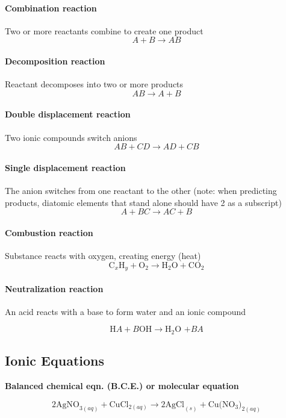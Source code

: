 \documentclass[a4paper, 12pt]{article}
\begin{document}
\paragraph{Combination reaction}
Two or more reactants combine to create one product
$$ A + B \longrightarrow AB$$

\paragraph{Decomposition reaction}
Reactant decomposes into two or more products
$$ AB \longrightarrow A + B$$ 

\paragraph{Double displacement reaction}
Two ionic compounds switch anions
$$ AB + CD \longrightarrow AD + CB$$ 

\paragraph{Single displacement reaction}
The anion switches from one reactant to the other (note: when predicting products, diatomic elements that stand alone should have 2 as a subscript)
$$ A + BC \longrightarrow AC + B$$ 

\paragraph{Combustion reaction}
Substance reacts with oxygen, creating energy (heat)
$$ \text{C}_x\text{H}_y + \text{O}_2 \longrightarrow \text{H}_2\text{O} + \text{CO}_2$$

\paragraph{Neutralization reaction}
An acid reacts with a base to form water and an ionic compound

$$\text{H}A + B\text{OH} \longrightarrow \text{H$_2$O +} BA $$

\subsection*{Ionic Equations}

\textbf{Balanced chemical eqn. (B.C.E.) or molecular equation}

$$2\text{AgNO}_{3(aq)} + \text{CuCl}_{2(aq)} \longrightarrow 2\text{AgCl}_{(s)} + \text{Cu(NO$_3$)}_{2(aq)}$$
\end{document}
